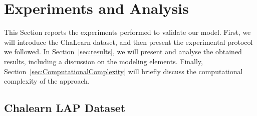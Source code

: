 

\section{Experiments and Analysis}

This Section reports the experiments performed to validate our model.
First, we will introduce the ChaLearn dataset, and then present the experimental protocol we followed.
In Section~\ref{sec:results}, we will present and analyse the obtained results, including a discussion
on the modeling elements.
Finally, Section~\ref{sec:ComputationalComplexity} will briefly discuss the computational complexity of the approach.




\subsection{Chalearn LAP Dataset}
\label{sec:chalearn}

